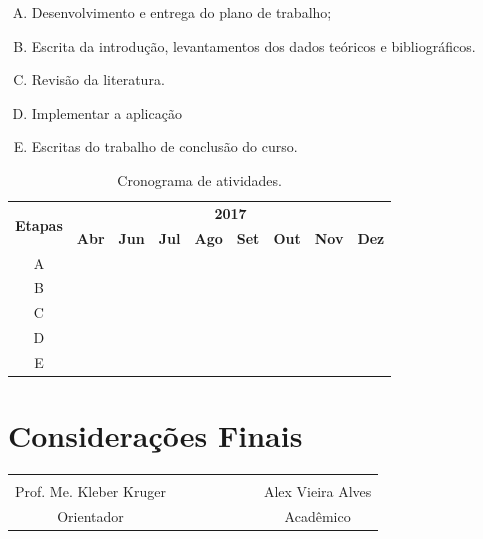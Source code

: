 \documentclass[a4paper,12pt,portuguese]{ufms-cpcx}
\begin{document}
\begin{enumerate}[(A)]
	
	\item Desenvolvimento e entrega do plano de trabalho;
	\item Escrita da introdução, levantamentos dos dados teóricos e bibliográficos.
	\item Revisão da literatura. 
	\item Implementar a aplicação
	\item Escritas do trabalho de conclusão do curso.		
	
	
\end{enumerate}


\begin{table}[!h]
	\renewcommand{\arraystretch}{1.3}
	\centering
	\begin{tabular}{|c|cccccccc|}
		\hline
		\multirow{2}{*}{\textbf{Etapas}} & \multicolumn{8}{c|}{\textbf{2017}} \\
		& \textbf{Abr} & \textbf{Jun} & \textbf{Jul} & \textbf{Ago} & \textbf{Set} & \textbf{Out} & \textbf{Nov} & \textbf{Dez}  \\
		\hline
		A & \checkmark & \checkmark & & & & & &  \\
		\hline
		B & & \checkmark & \checkmark & & & & &  \\
		\hline
		C & & & \checkmark & \checkmark & & & & \\
		\hline
		D & & & & \checkmark & \checkmark & \checkmark & &  \\
		\hline
		E & & & & & & & \checkmark & \checkmark \\
		\hline
	
		
	\end{tabular}
	\caption[Cronograma de atividades]{Cronograma de atividades.}
	\label{Tab:cronograma}
\end{table}

\chapter{Considerações Finais}


\vskip 10cm
\begin{table}[!h]
	\renewcommand{\arraystretch}{1.3}
	\centering
	\begin{tabular}{cccccccc}
		& & & & & & & \\
		Prof. Me. Kleber Kruger & & & & & & & Alex Vieira Alves \\
		Orientador & & & & & & & Acadêmico \\
	\end{tabular}
\end{table}


\cleardoublepage
{} 

% 

%
\end{document}
